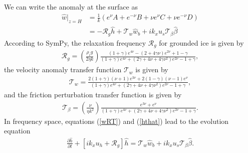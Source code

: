 \documentclass[paper=a4, fontsize=11pt]{article}
\begin{document}
We can write the anomaly at the surface as
\begin{align}
\widehat{w}|_{z=H} &= \frac{1}{k}\left(e^{\nu} A + { e^{-\nu}}B + \nu e^{\nu} C + {\nu}{ e^{-\nu}} D\right) \\
&= -\mathcal{R}_g\widehat{h} + \mathcal{T}_w\widehat{w}_b  +ik_x u_s  \mathcal{T}_{\beta}  \widehat{\beta}\label{wRT}
\end{align}
According to SymPy, the relaxation frequency $\mathcal{R}_g$ for grounded ice is given by
\begin{align}
\mathcal{R}_g = \left(\frac{\rho_i g }{2\eta k}\right)\frac{ (1+\gamma)e^{4\nu} -(2+4\gamma\nu)e^{2\nu} +1-\gamma  }{ (1+\gamma)e^{4\nu} + (2\gamma+4\nu+4\gamma\nu^2)e^{2\nu} -1 + \gamma  },
\end{align}
the velocity anomaly transfer function $\mathcal{T}_w$ is given by
\begin{align}
\mathcal{T}_w = \frac{2(1+\gamma)(\nu+1)e^{3\nu}+2(1-\gamma)(\nu-1)e^{\nu}  }{(1+\gamma)e^{4\nu} + (2\gamma+4\nu+4\gamma\nu^2)e^{2\nu} -1 + \gamma },
\end{align}
and the friction perturbation transfer function is given by
\begin{align}
\mathcal{T}_{\beta} =  \left(\frac{\nu}{\eta k^2}\right) \frac{e^{3\nu} + e^{\nu}}{ (1+\gamma)e^{4\nu} + (2\gamma+4\nu+4\gamma\nu^2)e^{2\nu} -1 + \gamma  }.
\end{align}
In frequency space,
equations (\ref{wRT}) and (\ref{hthat}) lead to the evolution equation
\begin{align}
\frac{\partial \widehat{h}}{\partial t}+ \left[ik_x u_h  + \mathcal{R}_g\right]\widehat{h} = \mathcal{T}_w\widehat{w}_b+ik_x u_s\mathcal{T}_{\beta} \widehat{\beta}. \label{dhhat}
\end{align}
\end{document}
